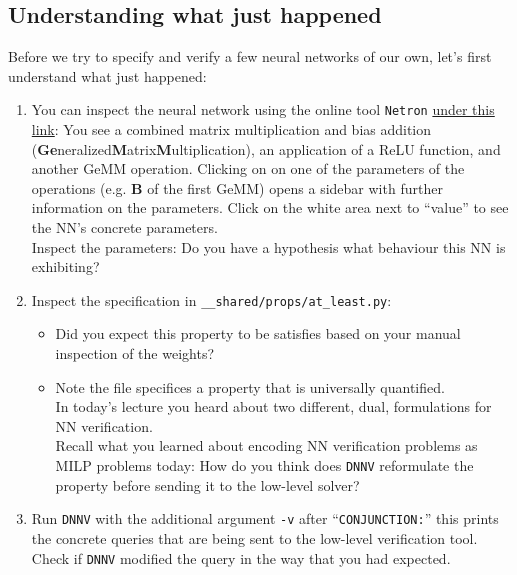 \documentclass[11pt,fleqn]{article}
\begin{document}
\subsection*{Understanding what just happened}
Before we try to specify and verify a few neural networks of our own, let's first understand what just happened:
\begin{enumerate}
    \item You can inspect the neural network using the online tool \texttt{Netron} \href{https://netron.app/?url=https://raw.githubusercontent.com/samysweb/nn-verification-101/refs/heads/main/provided/nets/at_least.onnx}{under this link}:
    You see a combined matrix multiplication and bias addition (\textbf{Ge}neralized\textbf{M}atrix\textbf{M}ultiplication), an application of a ReLU function, and another GeMM operation.
    Clicking on on one of the parameters of the operations (e.g. \textbf{B} of the first GeMM) opens a sidebar with further information on the parameters.
    Click on the white area next to ``value'' to see the NN's concrete parameters.\\
    Inspect the parameters: Do you have a hypothesis what behaviour this NN is exhibiting?
    \item Inspect the specification in \texttt{\_\_shared/props/at\_least.py}:
    \begin{itemize}
        \item Did you expect this property to be satisfies based on your manual inspection of the weights?
        \item Note the file specifices a property that is universally quantified.\\
        In today's lecture you heard about two different, dual, formulations for NN verification.\\
        Recall what you learned about encoding NN verification problems as MILP problems today:
        How do you think does \texttt{DNNV} reformulate the property before sending it to the low-level solver?
    \end{itemize}
    \item Run \texttt{DNNV} with the additional argument \texttt{-v} after ``\texttt{CONJUNCTION:}'' this prints the concrete queries that are being sent to the low-level verification tool.\\
    Check if \texttt{DNNV} modified the query in the way that you had expected.
\end{enumerate}
\end{document}
